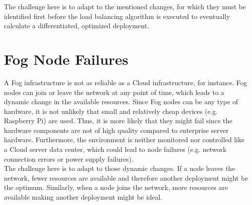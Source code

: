 The challenge here is to adapt to the mentioned changes, for which they must be identified first before the load balancing algorithm is executed to eventually calculate a differentiated, optimized deployment.

\section{Fog Node Failures}
A Fog infrastructure is not as reliable as a Cloud infrastructure, for instance. Fog nodes can join or leave the network at any point of time, which leads to a dynamic change in the available resources. Since Fog nodes can be any type of hardware, it is not unlikely that small and relatively cheap devices (e.g. Raspberry Pi) are used. Thus, it is more likely that they might fail since the hardware components are not of high quality compared to enterprise server hardware. Furthermore, the environment is neither monitored nor controlled like a Cloud server data center, which could lead to node failures (e.g. network connection errors or power supply failures).\\

The challenge here is to adapt to those dynamic changes.
If a node leaves the network, fewer resources are available and therefore another deployment might be the optimum.
Similarly, when a node joins the network, more resources are available making another deployment might be ideal.
